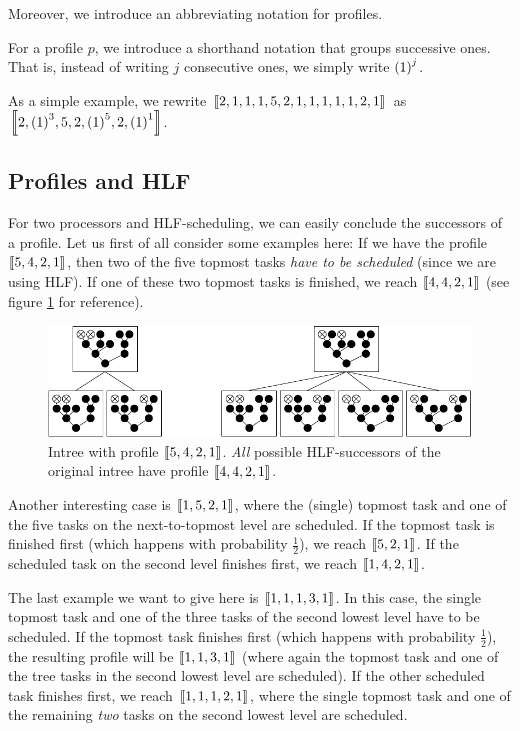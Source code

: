 Moreover, we introduce an abbreviating notation for profiles.

\begin{definition}
  For a profile $p$, we introduce a shorthand notation that groups successive ones. That is, instead of writing $j$ consecutive ones, we simply write ${(1)}^{j}$.
\end{definition}

As a simple example, we rewrite $\left\llbracket 2,1,1,1,5,2,1,1,1,1,1,2,1 \right\rrbracket$ as 
$\left\llbracket 2,{(1)}^{3},5,2,{(1)}^{5},2,{(1)}^{1} \right\rrbracket$.

\subsection{Profiles and HLF}
\label{sec:p2-simple-method-runtime-profiles-hlf}

For two processors and HLF-scheduling, we can easily conclude the successors of a profile. Let us first of all consider some examples here: If we have the profile $\left\llbracket 5,4,2,1 \right\rrbracket$, then two of the five topmost tasks \emph{have to be scheduled} (since we are using HLF). If one of these two topmost tasks is finished, we reach $\left\llbracket 4,4,2,1 \right\rrbracket$ (see figure \ref{fig:p2-profiles-successors-of-5421-always-same} for reference).

\begin{figure}[ht]
  \centering
  \includegraphics{p2/hlf_succs_same_profile.pdf}
  \caption{Intree with profile $\left\llbracket 5,4,2,1 \right\rrbracket$. \emph{All} possible HLF-successors of the original intree have profile $\left\llbracket 4,4,2,1 \right\rrbracket$.}
  \label{fig:p2-profiles-successors-of-5421-always-same}
\end{figure}

Another interesting case is $\left\llbracket 1,5,2,1 \right\rrbracket$, where the (single) topmost task and one of the five tasks on the next-to-topmost level are scheduled. If the topmost task is finished first (which happens with probability $\frac{1}{2}$), we reach $\left\llbracket 5,2,1 \right\rrbracket$. If the scheduled task on the second level finishes first, we reach $\left\llbracket 1,4,2,1 \right\rrbracket$.

The last example we want to give here is $\left\llbracket 1,1,1,3,1 \right\rrbracket$. In this case, the single topmost task and one of the three tasks of the second lowest level have to be scheduled. If the topmost task finishes first (which happens with probability $\frac{1}{2}$), the resulting profile will be $\left\llbracket 1,1,3,1 \right\rrbracket$ (where again the topmost task and one of the tree tasks in the second lowest level are scheduled). If the other scheduled task finishes first, we reach $\left\llbracket 1,1,1,2,1 \right\rrbracket$, where the single topmost task and one of the remaining \emph{two} tasks on the second lowest level are scheduled.


